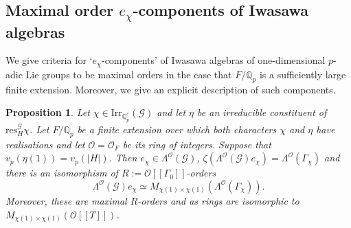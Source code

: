 \documentclass[12pt]{amsart}
\theoremstyle{plain}
\newtheorem{prop}[theorem]{Proposition}
\theoremstyle{remark}
\theoremstyle{definition}
\numberwithin{equation}{section}
\begin{document}
\subsection{Maximal order $e_{\chi}$-components of Iwasawa algebras}
We give criteria for `$e_{\chi}$-components' of Iwasawa algebras of one-dimensional $p$-adic Lie groups to be maximal orders
in the case that $F/{\mathbb{Q}}_{p}$ is a sufficiently large finite extension. Moreover,
we give an explicit description of such components.

\begin{prop}\label{prop:chi-comp-max-order}
Let  $\chi \in {\mathrm{Irr}}_{{\mathbb{Q}}_{p}^{c}}(\mathcal{G})$ and let $\eta$ be an irreducible constituent of
${\mathrm{res}}^{\mathcal{G}}_{H} \chi$.
Let $F/{\mathbb{Q}}_{p}$ be a finite extension over which both characters $\chi$ and $\eta$ have realisations
and let $\mathcal{O}=\mathcal{O}_{F}$ be its ring of integers.
Suppose that $v_{p}(\eta(1))=v_{p}(|H|)$.
Then $e_{\chi} \in \Lambda^{\mathcal{O}}(\mathcal{G})$,
$\zeta(\Lambda^{\mathcal{O}}(\mathcal{G})e_{\chi}) = \Lambda^{\mathcal{O}}(\Gamma_{\chi})$
and there is an isomorphism of $R:=\mathcal{O}[[\Gamma_{0}]]$-orders
\[
\Lambda^{\mathcal{O}}(\mathcal{G})e_{\chi} \simeq M_{\chi(1) \times \chi(1)}(\Lambda^{\mathcal{O}}(\Gamma_{\chi})).
\]
Moreover, these are maximal $R$-orders and as rings are isomorphic to $M_{\chi(1) \times \chi(1)}(\mathcal{O}[[T]])$.
\end{prop}
\end{document}
